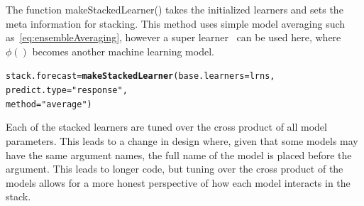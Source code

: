 \documentclass[12pt]{article}\usepackage[]{graphicx}\usepackage[]{color}
\makeatletter
\newcommand{\hlstr}[1]{\textcolor[rgb]{0.192,0.494,0.8}{#1}}%
\newcommand{\hlstd}[1]{\textcolor[rgb]{0.345,0.345,0.345}{#1}}%
\newcommand{\hlkwb}[1]{\textcolor[rgb]{0.69,0.353,0.396}{#1}}%
\newcommand{\hlkwc}[1]{\textcolor[rgb]{0.333,0.667,0.333}{#1}}%
\newcommand{\hlkwd}[1]{\textcolor[rgb]{0.737,0.353,0.396}{\textbf{#1}}}%
\newenvironment{kframe}{%
 \def\at@end@of@kframe{}%
 \ifinner\ifhmode%
  \def\at@end@of@kframe{\end{minipage}}%
  \begin{minipage}{\columnwidth}%
 \fi\fi%
 \def\FrameCommand##1{\hskip\@totalleftmargin \hskip-\fboxsep
 \colorbox{shadecolor}{##1}\hskip-\fboxsep
     \hskip-\linewidth \hskip-\@totalleftmargin \hskip\columnwidth}%
 \MakeFramed {\advance\hsize-\width
   \@totalleftmargin\z@ \linewidth\hsize
   \@setminipage}}%
 {\par\unskip\endMakeFramed%
 \at@end@of@kframe}
\newenvironment{knitrout}{}{} %
\theoremstyle{definition}
\newcommand\code{\@codex}
\def\@codex#1{{\normalfont\ttfamily\hyphenchar\font=-1 #1}}
\makeatother
\begin{document}
The function \code{makeStackedLearner()} takes the initialized learners and sets the meta information for stacking. This method uses simple model averaging such as~\ref{eq:ensembleAveraging}, however a super learner~\cite{Wolpert92stackedgeneralization} can be used here, where $\phi()$ becomes another machine learning model.

\singlespacing
\begin{knitrout}
\color{fgcolor}\begin{kframe}
\begin{alltt}
\hlstd{stack.forecast} \hlkwb{=} \hlkwd{makeStackedLearner}\hlstd{(}\hlkwc{base.learners} \hlstd{= lrns,}
                       \hlkwc{predict.type} \hlstd{=} \hlstr{"response"}\hlstd{,}
                       \hlkwc{method} \hlstd{=} \hlstr{"average"}\hlstd{)}
\end{alltt}
\end{kframe}
\end{knitrout}
\doublespacing

Each of the stacked learners are tuned over the cross product of all model parameters. This leads to a change in design where, given that some models may have the same argument names, the full name of the model is placed before the argument. This leads to longer code, but tuning over the cross product of the models allows for a more honest perspective of how each model interacts in the stack.
\end{document}
